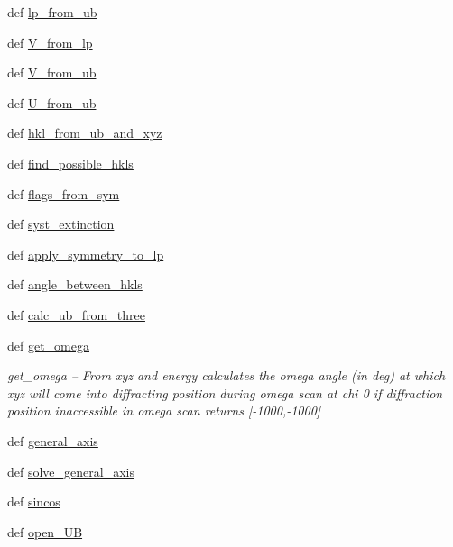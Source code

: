 \begin{DoxyCompactItemize}
\item 
def \hyperlink{namespacecrystallography_afa94b4aac1d8fd726f31e98915aa3833}{lp\-\_\-from\-\_\-ub}
\item 
def \hyperlink{namespacecrystallography_a49712413ea299a47440e3db9b0d187cd}{V\-\_\-from\-\_\-lp}
\item 
def \hyperlink{namespacecrystallography_ace21f698f6a91880ff79b26cce3d44a1}{V\-\_\-from\-\_\-ub}
\item 
def \hyperlink{namespacecrystallography_a8b7bd586e750f963562e8811b171dc85}{U\-\_\-from\-\_\-ub}
\item 
def \hyperlink{namespacecrystallography_ade33673c59999578962f7e3574fd66f5}{hkl\-\_\-from\-\_\-ub\-\_\-and\-\_\-xyz}
\item 
def \hyperlink{namespacecrystallography_a1135eb3d895d4db119f03dfe03b16246}{find\-\_\-possible\-\_\-hkls}
\item 
def \hyperlink{namespacecrystallography_afc7e18304cb893ba82f482dda7a8203a}{flags\-\_\-from\-\_\-sym}
\item 
def \hyperlink{namespacecrystallography_a4e57db686b17b444803bf0b345633bcc}{syst\-\_\-extinction}
\item 
def \hyperlink{namespacecrystallography_a3e5709b266157e0701be4d336c074648}{apply\-\_\-symmetry\-\_\-to\-\_\-lp}
\item 
def \hyperlink{namespacecrystallography_aceeb721a52e4341dc482f2830ab13c9c}{angle\-\_\-between\-\_\-hkls}
\item 
def \hyperlink{namespacecrystallography_af905b3d3c9e00d94a3bda5150b55d8bd}{calc\-\_\-ub\-\_\-from\-\_\-three}
\item 
def \hyperlink{namespacecrystallography_a5c3a3554b9a344670d7ea9126758f76d}{get\-\_\-omega}
\begin{DoxyCompactList}\small\item\em get\-\_\-omega -- From xyz and energy calculates the omega angle (in deg) at which xyz will come into diffracting position during omega scan at chi 0 if diffraction position inaccessible in omega scan returns \mbox{[}-\/1000,-\/1000\mbox{]} \end{DoxyCompactList}\item 
def \hyperlink{namespacecrystallography_a135f57254d70c8f690eb769d3ad18437}{general\-\_\-axis}
\item 
def \hyperlink{namespacecrystallography_ada28fca5d9f6fd5ab456edc3e32713e1}{solve\-\_\-general\-\_\-axis}
\item 
def \hyperlink{namespacecrystallography_a0a424f36ab371104637e16161cbf9b73}{sincos}
\item 
def \hyperlink{namespacecrystallography_a0da34711a0fdb2fc186eac5a965e35d6}{open\-\_\-\-U\-B}
\end{DoxyCompactItemize}
